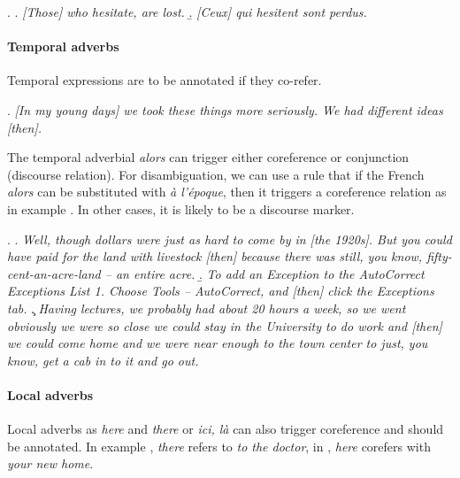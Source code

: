 \documentclass[a4paper]{article}
\begin{document}
{{\ex.
\a. {\sl [Those] who hesitate, are lost.}
\b. \textsl{[Ceux] qui hesitent sont perdus.}


\paragraph*{Temporal adverbs}

Temporal expressions are to be annotated if they co-refer.

\ex.
\textsl{[In my young days] we took these things more seriously. We had different ideas [then].}

The temporal adverbial \textsl{alors} can trigger either coreference or
conjunction (discourse relation). For disambiguation, we can use a rule that if
the French {\sl alors} can be substituted with {\sl à l'époque}, then it
triggers a coreference relation as in example \Next[a]. In  other cases, it is
likely to be a discourse marker. 

\ex.
\a. {\sl Well, though dollars were just as hard to come by in [the 1920s]. But you could have paid for the land with livestock [then] because there was still, you know, fifty-cent-an-acre-land -- an entire acre.}
\b. {\sl To add an Exception to the AutoCorrect Exceptions List 1. Choose Tools -- AutoCorrect, and [then] click the Exceptions tab.}
\c. {\sl 
Having lectures, we probably had about 20 hours a week, so we went obviously we were so close we could stay in the University to do work and [then] we could come home and we were near enough to the town center to just, you know, get a cab in to it and go out.}

\paragraph*{Local adverbs}
Local adverbs as {\sl here} and {\sl there} or {\sl ici, là} can also trigger
coreference and should be annotated. In example \Next[a], {\sl there} refers to
{\sl to the doctor}, in \Next[b], {\sl here} corefers with {\sl your new home}.

}}
\end{document}
